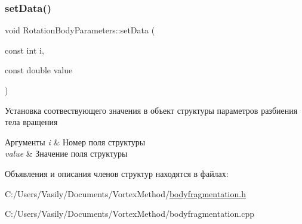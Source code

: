 \subsubsection{\texorpdfstring{set\+Data()}{setData()}}
{\footnotesize\ttfamily void Rotation\+Body\+Parameters\+::set\+Data (\begin{DoxyParamCaption}\item[{const int}]{i,  }\item[{const double}]{value }\end{DoxyParamCaption})}

Установка соотвествующего значения в объект структуры параметров разбиения тела вращения 
\begin{DoxyParams}{Аргументы}
{\em i} & Номер поля структуры \\
\hline
{\em value} & Значение поля структуры \\
\hline
\end{DoxyParams}


Объявления и описания членов структур находятся в файлах\+:\begin{DoxyCompactItemize}
\item 
C\+:/\+Users/\+Vasily/\+Documents/\+Vortex\+Method/\mbox{\hyperlink{bodyfragmentation_8h}{bodyfragmentation.\+h}}\item 
C\+:/\+Users/\+Vasily/\+Documents/\+Vortex\+Method/bodyfragmentation.\+cpp\end{DoxyCompactItemize}
